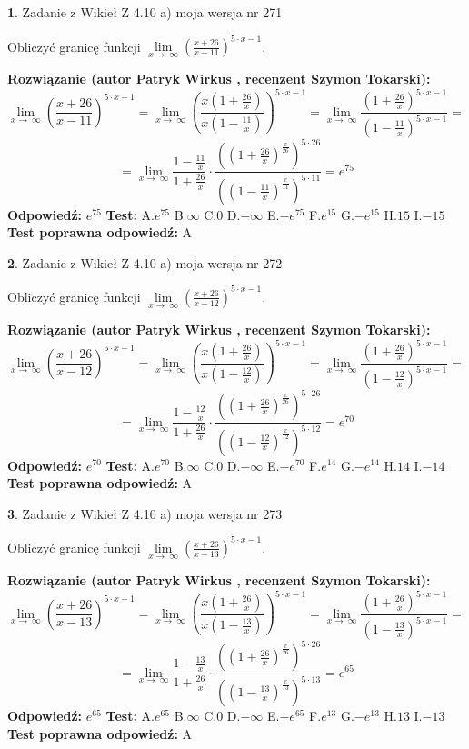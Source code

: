 \documentclass[12pt, a4paper]{article}
\theoremstyle{definition} %
\newtheorem{zad}{}
\newcommand{\zadStart}[1]{\begin{zad}#1\newline}
\newcommand{\zadStop}{\end{zad}}
\newcommand{\rozwStart}[2]{\noindent \textbf{Rozwiązanie (autor #1 , recenzent #2): }\newline}
\newcommand{\rozwStop}{\newline}
\newcommand{\odpStart}{\noindent \textbf{Odpowiedź:}\newline}
\newcommand{\odpStop}{\newline}
\newcommand{\testStart}{\noindent \textbf{Test:}\newline}
\newcommand{\testStop}{\newline}
\newcommand{\kluczStart}{\noindent \textbf{Test poprawna odpowiedź:}\newline}
\newcommand{\kluczStop}{\newline}
\begin{document}
\zadStart{Zadanie z Wikieł Z 4.10 a) moja wersja nr 271}

Obliczyć granicę funkcji  $\lim\limits_{x\to\ \infty}(\frac{x+26}{x-11})^{5\cdot x-1}$.
\zadStop
\rozwStart{Patryk Wirkus}{Szymon Tokarski}
$$\lim\limits_{x\to\ \infty}(\frac{x+26}{x-11})^{5\cdot x-1} = \lim\limits_{x\to\ \infty}(\frac{x(1+\frac{26}{x})}{x(1-\frac{11}{x})})^{5\cdot x-1}=\lim\limits_{x\to\ \infty}\frac{(1+\frac{26}{x})^{5\cdot x-1}}{(1-\frac{11}{x})^{5\cdot x-1}}=$$
$$=\lim\limits_{x\to\ \infty}\frac{1-\frac{11}{x}}{1+\frac{26}{x}}\cdot\frac{((1+\frac{26}{x})^{\frac{x}{26}})^{5\cdot26}}{((1-\frac{11}{x})^{\frac{x}{11}})^{5\cdot11}}=e^{75}$$
\rozwStop
\odpStart
$e^{75}$
\odpStop
\testStart
A.$e^{75}$ B.$\infty$ C.$0$ D.$-\infty$ E.$-e^{75}$
F.$e^{15}$ G.$-e^{15}$
H.$15$
I.$-15$
\testStop
\kluczStart
A
\kluczStop



\zadStart{Zadanie z Wikieł Z 4.10 a) moja wersja nr 272}

Obliczyć granicę funkcji  $\lim\limits_{x\to\ \infty}(\frac{x+26}{x-12})^{5\cdot x-1}$.
\zadStop
\rozwStart{Patryk Wirkus}{Szymon Tokarski}
$$\lim\limits_{x\to\ \infty}(\frac{x+26}{x-12})^{5\cdot x-1} = \lim\limits_{x\to\ \infty}(\frac{x(1+\frac{26}{x})}{x(1-\frac{12}{x})})^{5\cdot x-1}=\lim\limits_{x\to\ \infty}\frac{(1+\frac{26}{x})^{5\cdot x-1}}{(1-\frac{12}{x})^{5\cdot x-1}}=$$
$$=\lim\limits_{x\to\ \infty}\frac{1-\frac{12}{x}}{1+\frac{26}{x}}\cdot\frac{((1+\frac{26}{x})^{\frac{x}{26}})^{5\cdot26}}{((1-\frac{12}{x})^{\frac{x}{12}})^{5\cdot12}}=e^{70}$$
\rozwStop
\odpStart
$e^{70}$
\odpStop
\testStart
A.$e^{70}$ B.$\infty$ C.$0$ D.$-\infty$ E.$-e^{70}$
F.$e^{14}$ G.$-e^{14}$
H.$14$
I.$-14$
\testStop
\kluczStart
A
\kluczStop



\zadStart{Zadanie z Wikieł Z 4.10 a) moja wersja nr 273}

Obliczyć granicę funkcji  $\lim\limits_{x\to\ \infty}(\frac{x+26}{x-13})^{5\cdot x-1}$.
\zadStop
\rozwStart{Patryk Wirkus}{Szymon Tokarski}
$$\lim\limits_{x\to\ \infty}(\frac{x+26}{x-13})^{5\cdot x-1} = \lim\limits_{x\to\ \infty}(\frac{x(1+\frac{26}{x})}{x(1-\frac{13}{x})})^{5\cdot x-1}=\lim\limits_{x\to\ \infty}\frac{(1+\frac{26}{x})^{5\cdot x-1}}{(1-\frac{13}{x})^{5\cdot x-1}}=$$
$$=\lim\limits_{x\to\ \infty}\frac{1-\frac{13}{x}}{1+\frac{26}{x}}\cdot\frac{((1+\frac{26}{x})^{\frac{x}{26}})^{5\cdot26}}{((1-\frac{13}{x})^{\frac{x}{13}})^{5\cdot13}}=e^{65}$$
\rozwStop
\odpStart
$e^{65}$
\odpStop
\testStart
A.$e^{65}$ B.$\infty$ C.$0$ D.$-\infty$ E.$-e^{65}$
F.$e^{13}$ G.$-e^{13}$
H.$13$
I.$-13$
\testStop
\kluczStart
A
\kluczStop
\end{document}
